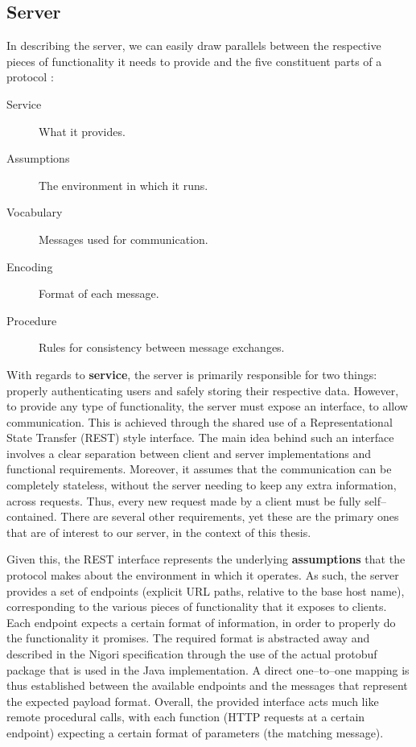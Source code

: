 \subsection{Server}
In describing the server, we can easily draw parallels between the respective pieces of functionality it needs to provide and the five constituent parts of a protocol \cite{ProtocolDesign}:
\begin{description}
  \item[Service] What it provides.
  \item[Assumptions] The environment in which it runs.
  \item[Vocabulary] Messages used for communication.
  \item[Encoding] Format of each message.
  \item[Procedure] Rules for consistency between message exchanges.
\end{description}

With regards to \textbf{service}, the server is primarily responsible for two things: properly authenticating users and safely storing their respective data.
However, to provide any type of functionality, the server must expose an interface, to allow communication.
This is achieved through the shared use of a Representational State Transfer (REST) \cite{REST} style interface.
The main idea behind such an interface involves a clear separation between client and server implementations and functional requirements.
Moreover, it assumes that the communication can be completely stateless, without the server needing to keep any extra information, across requests.
Thus, every new request made by a client must be fully self--contained.
There are several other requirements, yet these are the primary ones that are of interest to our server, in the context of this thesis.

Given this, the REST interface represents the underlying \textbf{assumptions} that the protocol makes about the environment in which it operates.
As such, the server provides a set of endpoints (explicit URL paths, relative to the base host name), corresponding to the various pieces of functionality that it exposes to clients.
Each endpoint expects a certain format of information, in order to properly do the functionality it promises.
The required format is abstracted away and described in the Nigori specification through the use of the actual protobuf \cite{protobuf} package that is used in the Java implementation.
A direct one--to--one mapping is thus established between the available endpoints and the messages that represent the expected payload format.
Overall, the provided interface acts much like remote procedural calls, with each function (HTTP requests at a certain endpoint) expecting a certain format of parameters (the matching message).

